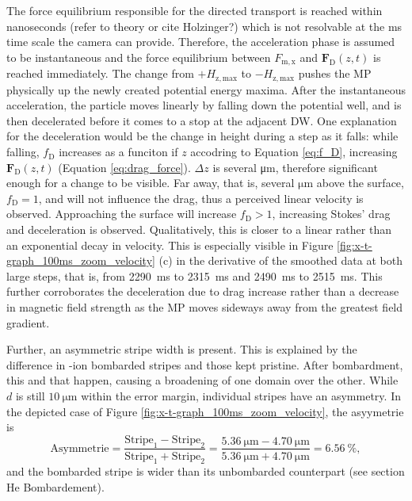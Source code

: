 The force equilibrium responsible for the directed transport is reached within nanoseconds (refer to theory or cite Holzinger?) which is not resolvable at the \si{ms} time scale the camera can provide.
Therefore, the acceleration phase is assumed to be instantaneous and the force equilibrium between $F_\mathrm{m,x}$ and $\mathbf{F}_\mathrm{D}(z,t)$ is reached immediately.
The change from $+H_\mathrm{z, max}$ to $-H_\mathrm{z, max}$ pushes the \ac{MP} physically up the newly created potential energy maxima. 
After the instantaneous acceleration, the particle moves linearly by falling down the potential well, and is then decelerated before it comes to a stop at the adjacent \ac{DW}.
One explanation for the deceleration would be the change in height during a step as it falls:
while falling, $f_\mathrm{D}$ increases as a funciton if $z$ accodring to Equation \ref{eq:f_D}, increasing $\mathbf{F}_\mathrm{D}(z,t)$ (Equation \ref{eq:drag_force}).
$\Delta z$ is several \si{\micro\m}\cite{Huhnstock2022}, therefore significant enough for a change to be visible.
Far away, that is, several $\si{\micro \m}$ above the surface, $f_\mathrm{D}=1$, and will not influence the drag, thus a perceived linear velocity is observed. 
Approaching the surface will increase $f_\mathrm{D}>1$, increasing Stokes' drag and deceleration is observed.
Qualitatively, this is closer to a linear rather than an exponential decay in velocity. 
This is especially visible in Figure \ref{fig:x-t-graph_100ms_zoom_velocity} (c) in the derivative of the smoothed data at both large steps, that is, from \SI{2290}{ms} to \SI{2315}{ms} and \SI{2490}{ms} to \SI{2515}{ms}.  
This further corroborates the deceleration due to drag increase rather than a decrease in magnetic field strength as the \ac{MP} moves sideways away from the greatest field gradient. 

Further, an asymmetric stripe width is present.
This is explained by the difference in -ion bombarded stripes and those kept pristine. 
After bombardment, this and that happen, causing a broadening of one domain over the other.
While $d$ is still $\SI{10}{\micro\m}$ within the error margin, individual stripes have an asymmetry.
In the depicted case of Figure \ref{fig:x-t-graph_100ms_zoom_velocity}, the asyymetrie is 
\begin{equation}
    \text{Asymmetrie} = \frac{\text{Stripe}_1 - \text{Stripe}_2}{\text{Stripe}_1 + \text{Stripe}_2} = \frac{\SI{5.36}{\micro\m} - \SI{4.70}{\micro\m}}{\SI{5.36}{\micro\m} + \SI{4.70}{\micro\m}} = \SI{6.56}{\percent},
\end{equation}
and the bombarded stripe is wider than its unbombarded counterpart (see section He Bombardement). 


